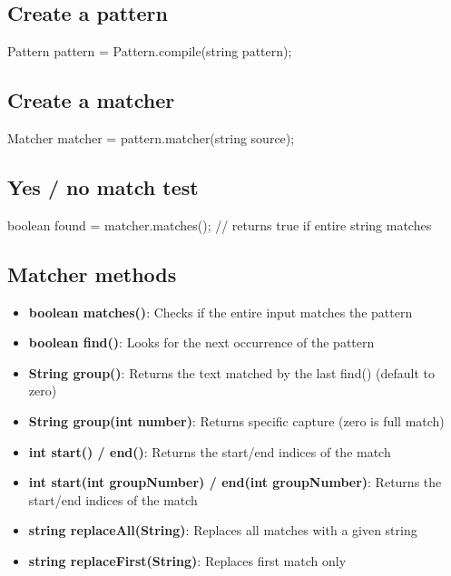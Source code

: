 \documentclass{report}
\begin{document}
    \bigbreak \noindent 
    \subsection{Create a pattern}
    \bigbreak \noindent 
    \begin{javacode}
        Pattern pattern = Pattern.compile(string pattern);
    \end{javacode}

    \bigbreak \noindent 
    \subsection{Create a matcher}
    \bigbreak \noindent 
    \begin{javacode}
    Matcher matcher = pattern.matcher(string source);
    \end{javacode}

    \bigbreak \noindent 
    \subsection{Yes / no match test}
    \bigbreak \noindent 
    \begin{javacode}
    boolean found = matcher.matches(); // returns true if entire string matches
    \end{javacode}

    \bigbreak \noindent 
    \subsection{Matcher methods}
    \begin{itemize}
        \item \textbf{boolean matches()}: Checks if the entire input matches the pattern
        \item \textbf{boolean find()}:	Looks for the next occurrence of the pattern
        \item \textbf{String group()}:	Returns the text matched by the last find() (default to zero)
        \item \textbf{String group(int number)}: Returns specific capture (zero is full match)	
        \item \textbf{int start() / end()}:	Returns the start/end indices of the match
        \item \textbf{int start(int groupNumber) / end(int groupNumber)}:	Returns the start/end indices of the match
        \item \textbf{string replaceAll(String)}: Replaces all matches with a given string
        \item \textbf{string replaceFirst(String)}: Replaces first match only
    \end{itemize}
\end{document}
